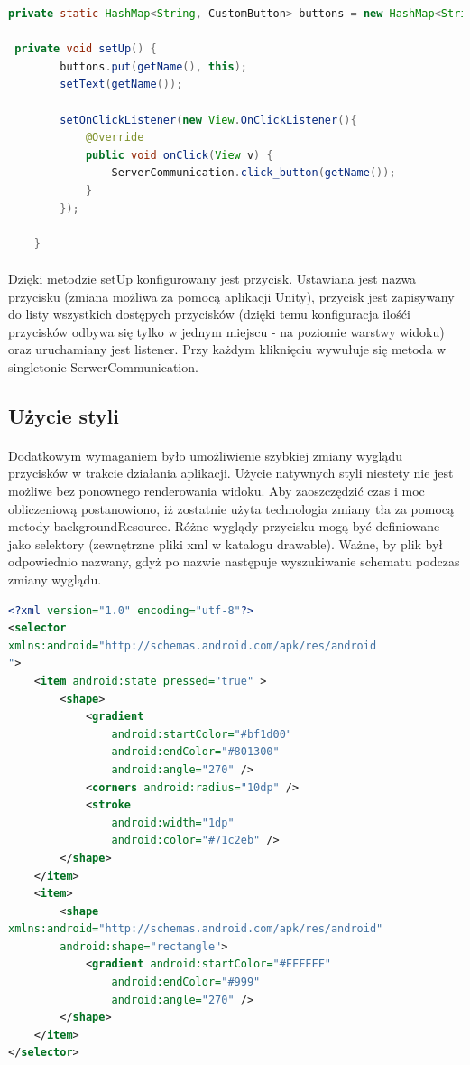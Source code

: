\begin{lstlisting}[language=Java]
private static HashMap<String, CustomButton> buttons = new HashMap<String, CustomButton>();

 private void setUp() {
        buttons.put(getName(), this);
        setText(getName());

        setOnClickListener(new View.OnClickListener(){
            @Override
            public void onClick(View v) {
                ServerCommunication.click_button(getName());
            }
        });

    }
\end{lstlisting}

\paragraph{}
Dzięki metodzie setUp konfigurowany jest przycisk. Ustawiana jest nazwa przycisku (zmiana możliwa za pomocą aplikacji Unity), przycisk jest zapisywany do listy wszystkich dostępych przycisków (dzięki temu konfiguracja ilośći przycisków odbywa się tylko w jednym miejscu - na poziomie warstwy widoku) oraz uruchamiany jest listener. Przy każdym kliknięciu wywułuje się metoda w singletonie SerwerCommunication.


\subsection{Użycie styli}
\paragraph{}
Dodatkowym wymaganiem było umożliwienie szybkiej zmiany wyglądu przycisków w trakcie działania aplikacji. Użycie natywnych styli niestety nie jest możliwe bez ponownego renderowania widoku. Aby zaoszczędzić czas i moc obliczeniową postanowiono, iż zostatnie użyta technologia zmiany tła za pomocą metody backgroundResource. Różne wyglądy przycisku mogą być definiowane jako selektory (zewnętrzne pliki xml w katalogu drawable). Ważne, by plik był odpowiednio nazwany, gdyż po nazwie następuje wyszukiwanie schematu podczas zmiany wyglądu.

\begin{lstlisting}[language=Xml]
<?xml version="1.0" encoding="utf-8"?>
<selector 
xmlns:android="http://schemas.android.com/apk/res/android
">
    <item android:state_pressed="true" >
        <shape>
            <gradient
                android:startColor="#bf1d00"
                android:endColor="#801300"
                android:angle="270" />
            <corners android:radius="10dp" />
            <stroke
                android:width="1dp"
                android:color="#71c2eb" />
        </shape>
    </item>
    <item>
        <shape 
xmlns:android="http://schemas.android.com/apk/res/android"
        android:shape="rectangle">
            <gradient android:startColor="#FFFFFF"
                android:endColor="#999"
                android:angle="270" />
        </shape>
    </item>
</selector>
\end{lstlisting}
